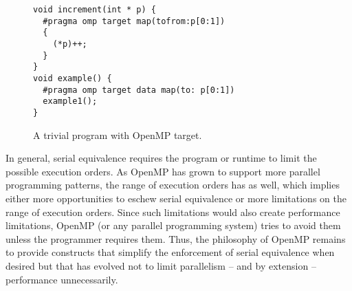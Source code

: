 \begin{figure}
\begin{verbatim}
void increment(int * p) {
  #pragma omp target map(tofrom:p[0:1])
  {
    (*p)++;
  }
}
void example() {
  #pragma omp target data map(to: p[0:1])
  example1();
}
\end{verbatim}
\caption{A trivial program with OpenMP target.\label{fig:trivial_target}}
\end{figure}

In general, serial equivalence requires the program or runtime to limit
the possible execution orders. As OpenMP has grown to support more parallel 
programming patterns, the range of execution orders has as well, which 
implies either more opportunities to eschew serial equivalence or more
limitations on the range of execution orders. Since such limitations would 
also create performance limitations, OpenMP (or any parallel programming 
system) tries to avoid them unless the programmer requires them. Thus, the 
philosophy of OpenMP remains to provide constructs that simplify the 
enforcement of serial equivalence when desired but that has evolved not 
to limit parallelism -- and by extension -- performance unnecessarily.

